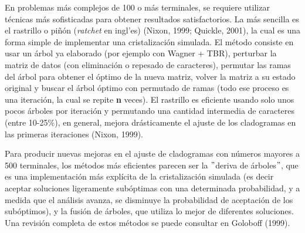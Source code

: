 \begin{itemize}
\begin{enumerate}
\begin{table}[H]
{\begin{tabular}{|c|c|c|}
 \end{tabular}
 }
 \end{table}

	En problemas m\'as complejos de 100 o m\'as terminales, se requiere utilizar t\'ecnicas m\'as sofisticadas para obtener resultados satisfactorios. La m\'as sencilla es el rastrillo o pi\~n\'on (\textit{ratchet} en ingl'es) {\color{red}(Nixon,  1999; Quickle,  2001)},  la cual es una forma simple de implementar una cristalizaci\'on simulada. El m\'etodo consiste en usar un \'arbol ya elaborado (por ejemplo con Wagner + TBR),  perturbar la matriz de datos (con eliminaci\'on o repesado de caracteres), permutar las ramas del \'arbol para obtener el \'optimo de la nueva matriz,  volver la matriz a su estado original y buscar el \'arbol \'optimo con permutado de ramas (todo ese proceso es una iteraci\'on,  la cual se repite \textbf{n} veces). El rastrillo es eficiente usando solo unos pocos \'arboles por iteraci\'on y permutando una cantidad intermedia de caracteres (entre 10-25\%), en general, mejora dr\'asticamente el ajuste de los cladogramas en las primeras iteraciones (Nixon,  1999).
 
	Para producir nuevas mejoras en el ajuste de cladogramas con n\'umeros mayores a 500 terminales,  los m\'etodos m\'as eficientes parecen ser la $"$deriva de \'arboles$"$,  que es una implementaci\'on m\'as expl\'icita de la cristalizaci\'on simulada (es decir aceptar soluciones ligeramente sub\'optimas con una determinada probabilidad,  y a medida que el an\'alisis avanza,  se disminuye la probabilidad de aceptaci\'on de los sub\'optimos),  y la fusi\'on de \'arboles,  que utiliza lo mejor de diferentes soluciones. Una revisi\'on completa de estos m\'etodos se puede consultar en {\color{red} Goloboff (1999)}.
  
  




\end{enumerate}
\end{itemize}
